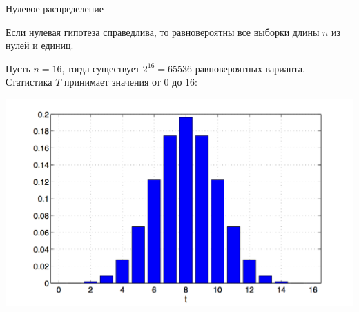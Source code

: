 \documentclass[11pt,pdf,utf8,hyperref={unicode},aspectratio=169]{beamer}
\begin{document}
\begin{frame}{Нулевое распределение}

	Если нулевая гипотеза справедлива, то равновероятны все выборки длины $n$ из нулей и единиц.

	\bigskip

	Пусть $n=16$, тогда существует $2^{16} = 65536$ равновероятных варианта. Статистика $T$ принимает значения от $0$ до $16$:

	\begin{center}
		\includegraphics[height=0.5\textheight]{bond1.png}
	\end{center}

\end{frame}
\end{document}
